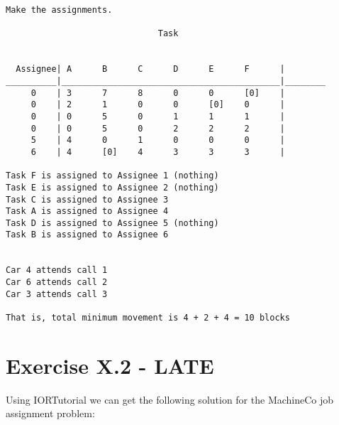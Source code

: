 \documentclass[titlepage, letterpaper]{article}
\begin{document}
\begin{lstlisting}[basicstyle=\tiny]
Make the assignments.

                              Task


  Assignee| A      B      C      D      E      F      |
__________|___________________________________________|________
     0    | 3      7      8      0      0      [0]    | 
     0    | 2      1      0      0      [0]    0      | 
     0    | 0      5      0      1      1      1      | 
     0    | 0      5      0      2      2      2      | 
     5    | 4      0      1      0      0      0      | 
     6    | 4      [0]    4      3      3      3      | 

Task F is assigned to Assignee 1 (nothing)
Task E is assigned to Assignee 2 (nothing)
Task C is assigned to Assignee 3
Task A is assigned to Assignee 4
Task D is assigned to Assignee 5 (nothing)
Task B is assigned to Assignee 6


Car 4 attends call 1
Car 6 attends call 2
Car 3 attends call 3

That is, total minimum movement is 4 + 2 + 4 = 10 blocks
\end{lstlisting}

\section{Exercise X.2 - LATE} %
\label{sec:exercise_x_2}

Using IORTutorial we can get the following solution for the MachineCo job assignment problem:
\end{document}
